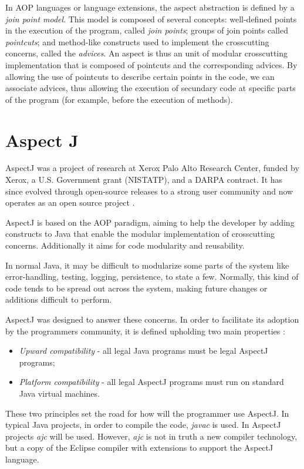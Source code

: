 \documentclass{template}
\begin{document}
In AOP languages or language extensions, the aspect abstraction is defined by a \emph{join point model}.
This model is composed of several concepts: well-defined points in the execution of the program,
called \emph{join points}; groups of join points called \emph{pointcuts}; and method-like constructs used to
implement the crosscutting concerns, called the \emph{advices}. An aspect is thus an unit of modular
crosscutting implementation that is composed of pointcuts and the corresponding advices. By allowing the
use of pointcuts to describe certain points in the code, we can associate advices, thus allowing the execution
of secundary code at specific parts of the program (for example, before the execution of methods).

\section{Aspect J}

AspectJ was a project of research at Xerox Palo Alto Research Center, funded by Xerox, a U.S. Government grant (NISTATP), and a DARPA contract. It has since evolved through open-source releases to a strong user community and now operates as an open source project \cite{AspectJ}.

AspectJ is based on the AOP paradigm, aiming to help the developer by adding constructs to Java that enable the modular implementation of crosscutting concerns. Additionally it aims for code modularity and reusability.

In normal Java, it may be difficult to modularize some parts of the system like error-handling, testing, logging, persistence, to state a few. Normally, this kind of code tends to be spread out across the system, making future changes or additions difficult to perform. 

AspectJ was designed to answer these concerns. In order to facilitate its adoption by the programmers community, it is defined upholding two main properties \cite{Kiczales97aspect-orientedprogramming}:

\begin{itemize}
\item \textit{Upward compatibility} - all legal Java programs must be legal AspectJ programs;
\item \textit{Platform compatibility} - all legal AspectJ programs must run on standard Java virtual machines. 
\end{itemize}

These two principles set the road for how will the programmer use AspectJ. In typical Java projects, in order to compile the code, \textit{javac} is used. In AspectJ projects \textit{ajc} will be used. However, \textit{ajc} is not in truth a new compiler technology, but a copy of the Eclipse compiler with extensions to support the AspectJ language. 
\end{document}

